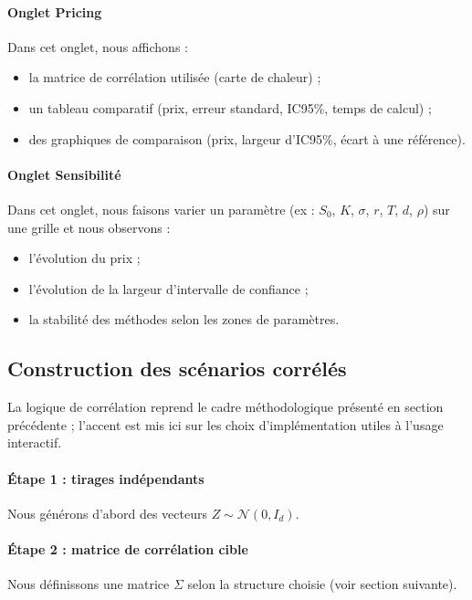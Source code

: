 ﻿\documentclass[11pt,a4paper]{article}
\begin{document}
\paragraph{Onglet Pricing}
Dans cet onglet, nous affichons :
\begin{itemize}
    \item la matrice de corrélation utilisée (carte de chaleur) ;
    \item un tableau comparatif (prix, erreur standard, IC95\%, temps de calcul) ;
    \item des graphiques de comparaison (prix, largeur d'IC95\%, écart à une référence).
\end{itemize}

\paragraph{Onglet Sensibilité}
Dans cet onglet, nous faisons varier un paramètre (ex : $S_0$, $K$, $\sigma$, $r$, $T$, $d$, $\rho$) sur une grille et nous observons :
\begin{itemize}
    \item l'évolution du prix ;
    \item l'évolution de la largeur d'intervalle de confiance ;
    \item la stabilité des méthodes selon les zones de paramètres.
\end{itemize}

\subsection{Construction des scénarios corrélés}

La logique de corrélation reprend le cadre méthodologique présenté en section précédente ; l'accent est mis ici sur les choix d'implémentation utiles à l'usage interactif.

\paragraph{Étape 1 : tirages indépendants}
Nous générons d'abord des vecteurs $Z \sim \mathcal N(0, I_d)$.

\paragraph{Étape 2 : matrice de corrélation cible}
Nous définissons une matrice $\Sigma$ selon la structure choisie (voir section suivante).
\end{document}
